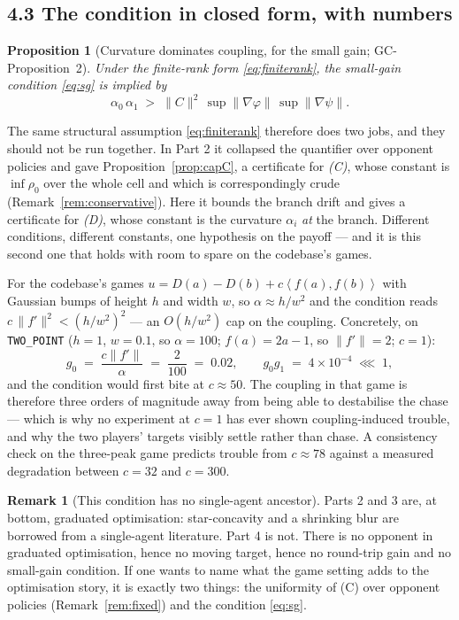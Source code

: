 \documentclass[11pt]{article}
\newtheorem{proposition}[theorem]{Proposition}
\theoremstyle{definition}
\newtheorem{remark}[theorem]{Remark}
\newcommand{\ip}[2]{\left\langle #1, #2 \right\rangle}
\newcommand{\GC}[1]{\textsf{GC-#1}}
\begin{document}
\subsection*{4.3 The condition in closed form, with numbers}

\begin{proposition}[Curvature dominates coupling, for the small gain;
\GC{Proposition~2}]\label{prop:cap}
Under the finite-rank form \eqref{eq:finiterank}, the small-gain condition
\eqref{eq:sg} is implied by
\[
  \alpha_0\,\alpha_1 \;>\; \|C\|^2\,\sup\|\nabla\varphi\|\,\sup\|\nabla\psi\| .
\]
\end{proposition}

The same structural assumption \eqref{eq:finiterank} therefore does two jobs, and
they should not be run together. In Part 2 it collapsed the quantifier over
opponent policies and gave Proposition~\ref{prop:capC}, a certificate for
\emph{(C)}, whose constant is $\inf\rho_0$ over the whole cell and which is
correspondingly crude (Remark~\ref{rem:conservative}). Here it bounds the branch
drift and gives a certificate for \emph{(D)}, whose constant is the curvature
$\alpha_i$ \emph{at} the branch. Different conditions, different constants, one
hypothesis on the payoff --- and it is this second one that holds with room to
spare on the codebase's games.

For the codebase's games $u = D(a) - D(b) + c\ip{f(a)}{f(b)}$ with Gaussian bumps
of height $h$ and width $w$, so $\alpha \approx h/w^2$ and the condition reads
$c\,\|f'\|^2 < (h/w^2)^2$ --- an $O(h/w^2)$ cap on the coupling. Concretely, on
\texttt{TWO\_POINT} ($h=1$, $w=0.1$, so $\alpha = 100$; $f(a) = 2a-1$, so
$\|f'\| = 2$; $c = 1$):
\[
  g_0 \;=\; \frac{c\|f'\|}{\alpha} \;=\; \frac{2}{100} \;=\; 0.02,
  \qquad
  g_0 g_1 \;=\; 4\times10^{-4} \;\lll\; 1 ,
\]
and the condition would first bite at $c \approx 50$. The coupling in that game is
therefore three orders of magnitude away from being able to destabilise the
chase --- which is why no experiment at $c=1$ has ever shown coupling-induced
trouble, and why the two players' targets visibly settle rather than chase. A
consistency check on the three-peak game predicts trouble from $c \approx 78$
against a measured degradation between $c = 32$ and $c = 300$.

\begin{remark}[This condition has no single-agent ancestor]\label{rem:gt}
Parts 2 and 3 are, at bottom, graduated optimisation: star-concavity and a
shrinking blur are borrowed from a single-agent literature. Part 4 is not. There
is no opponent in graduated optimisation, hence no moving target, hence no
round-trip gain and no small-gain condition. If one wants to name what the game
setting adds to the optimisation story, it is exactly two things: the uniformity
of (C) over opponent policies (Remark~\ref{rem:fixed}) and the condition
\eqref{eq:sg}.
\end{remark}
\end{document}
